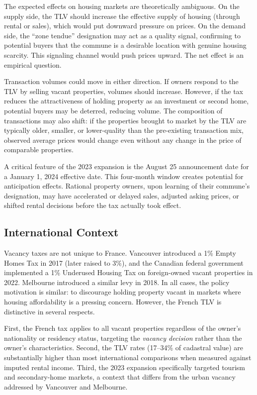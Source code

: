 \documentclass[12pt]{article}
\begin{document}
The expected effects on housing markets are theoretically ambiguous. On the supply side, the TLV should increase the effective supply of housing (through rental or sales), which would put downward pressure on prices. On the demand side, the ``zone tendue'' designation may act as a quality signal, confirming to potential buyers that the commune is a desirable location with genuine housing scarcity. This signaling channel would push prices upward. The net effect is an empirical question.

Transaction volumes could move in either direction. If owners respond to the TLV by selling vacant properties, volumes should increase. However, if the tax reduces the attractiveness of holding property as an investment or second home, potential buyers may be deterred, reducing volume. The composition of transactions may also shift: if the properties brought to market by the TLV are typically older, smaller, or lower-quality than the pre-existing transaction mix, observed average prices would change even without any change in the price of comparable properties.

A critical feature of the 2023 expansion is the August 25 announcement date for a January 1, 2024 effective date. This four-month window creates potential for anticipation effects. Rational property owners, upon learning of their commune's designation, may have accelerated or delayed sales, adjusted asking prices, or shifted rental decisions before the tax actually took effect.

\subsection{International Context}

Vacancy taxes are not unique to France. Vancouver introduced a 1\% Empty Homes Tax in 2017 (later raised to 3\%), and the Canadian federal government implemented a 1\% Underused Housing Tax on foreign-owned vacant properties in 2022. Melbourne introduced a similar levy in 2018. In all cases, the policy motivation is similar: to discourage holding property vacant in markets where housing affordability is a pressing concern. However, the French TLV is distinctive in several respects.

First, the French tax applies to all vacant properties regardless of the owner's nationality or residency status, targeting the \textit{vacancy decision} rather than the owner's characteristics. Second, the TLV rates (17--34\% of cadastral value) are substantially higher than most international comparisons when measured against imputed rental income. Third, the 2023 expansion specifically targeted tourism and secondary-home markets, a context that differs from the urban vacancy addressed by Vancouver and Melbourne.
\end{document}
